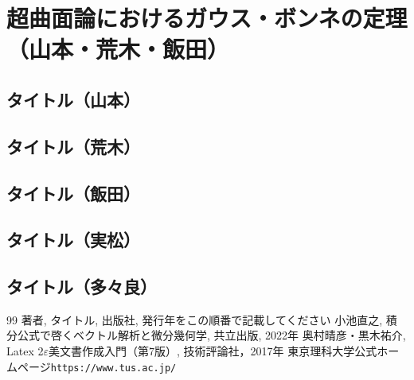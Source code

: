 \documentclass[12pt,a4j,final]{jreport}
\theoremstyle{definition}
\begin{document}
\chapter{超曲面論におけるガウス・ボンネの定理（山本・荒木・飯田）}

\section{タイトル（山本）}


\section{タイトル（荒木）}


\section{タイトル（飯田）}

\section{タイトル（実松）}


\section{タイトル（多々良）}










\begin{thebibliography}{99}
\thispagestyle{empty} %
 著者, タイトル, 出版社, 発行年をこの順番で記載してください
 小池直之, 積分公式で啓くベクトル解析と微分幾何学, 共立出版, 2022年
 奥村晴彦・黒木祐介, Latex 2$\varepsilon$美文書作成入門（第$7$版）,
技術評論社，2017年
 東京理科大学公式ホームページ\verb|https://www.tus.ac.jp/|
\end{thebibliography}
\end{document}
